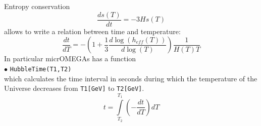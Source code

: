 \documentclass[12pt,a4paper]{article}
\begin{document}
Entropy conservation 
\begin{equation}
\label{EntropyConserv}
\frac{d s(T)}{ d t}= -3H s(T)
\end{equation}
allows to write a relation between time and temperature: 
\begin{equation}
 \frac{dt}{dT}=-\left(1+ \frac{1}{3} \frac{d\log(h_{eff}(T))}{d\log(T)}\right)\frac{1}{H(T) T} 
\end{equation}
In particular micrOMEGAs has a function\\  
\noindent$\bullet$ \verb|HubbleTime(T1,T2) |\\
which calculates  the time interval in  seconds  during which the  temperature of the Universe
decreases from {\tt T1[GeV]}  to {\tt T2[GeV]}.  
\begin{equation}
  t= \int \limits_{T_2}^{T_1} \left( -\frac{dt}{dT} \right) dT 
\end{equation}
\end{document}
